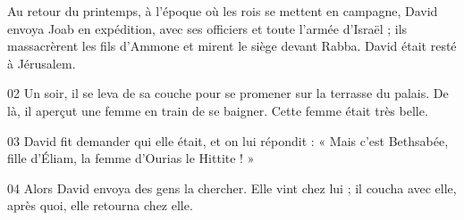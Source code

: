 Au retour du printemps, à l’époque où les rois se mettent en campagne, David envoya Joab en expédition, avec ses officiers et toute l’armée d’Israël ; ils massacrèrent les fils d’Ammone et mirent le siège devant Rabba. David était resté à Jérusalem.

02 Un soir, il se leva de sa couche pour se promener sur la terrasse du palais. De là, il aperçut une femme en train de se baigner. Cette femme était très belle.

03 David fit demander qui elle était, et on lui répondit : « Mais c’est Bethsabée, fille d’Éliam, la femme d’Ourias le Hittite ! »

04 Alors David envoya des gens la chercher. Elle vint chez lui ; il coucha avec elle, après quoi, elle retourna chez elle.
